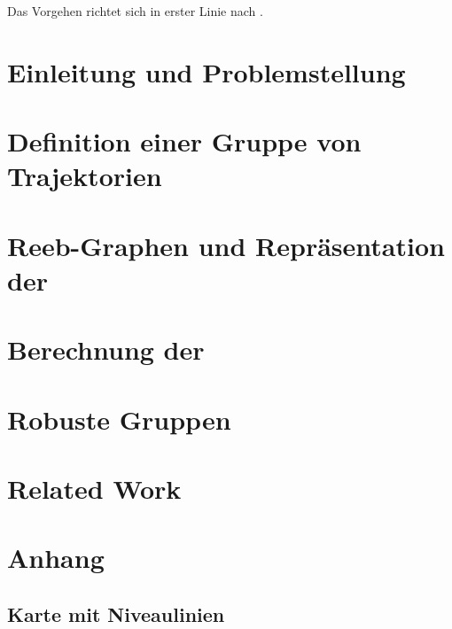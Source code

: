 




\tableofcontents

Das Vorgehen richtet sich in erster Linie nach \textcite{buchin2015}.
\cleardoubleoddemptypage%
\setcounter{page}{1}
\setcounter{footnote}{0}

\chapter{Einleitung und Problemstellung}%
\label{cha:einleitung}


\chapter{Definition einer Gruppe von Trajektorien}%
\label{cha:def_gruppe}


\chapter{Reeb-Graphen und Repräsentation der \GrpStruktur}%
\label{cha:reeb_graphen}


\chapter{Berechnung der \GrpStruktur}%
\label{cha:berechnung}


\chapter{Robuste Gruppen}%
\label{cha:robust}


\chapter{Related Work}%
\label{cha:related_work}







\cleardoubleoddemptypage%
\setcounter{page}{1}
\appendix
\chapter{Anhang}%
\label{cha:anhang}
\section{Karte mit Niveaulinien}%
\label{sec:karte_niveau}

\printindex
\listoffigures
\printbibliography%
\todototoc%

